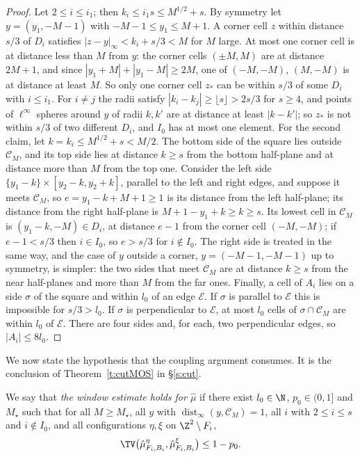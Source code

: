 \begin{proof}
Let $2 \le i \le i_1$; then $k_i \le i_1 s \le M^{1/2} + s$. By symmetry let $y = (y_1, -M - 1)$ with $-M - 1 \le y_1 \le M + 1$. A corner cell $z$ within distance $s/3$ of $D_i$ satisfies $|z - y|_\infty < k_i + s/3 < M$ for $M$ large. At most one corner cell is at distance less than $M$ from $y$: the corner cells $(\pm M, M)$ are at distance $2M + 1$, and since $|y_1 + M| + |y_1 - M| \ge 2M$, one of $(-M, -M)$, $(M, -M)$ is at distance at least $M$. So only one corner cell $z_*$ can be within $s/3$ of some $D_i$ with $i \le i_1$. For $i \neq j$ the radii satisfy $|k_i - k_j| \ge \lfloor s \rfloor > 2s/3$ for $s \ge 4$, and points of $\ell^\infty$ spheres around $y$ of radii $k, k'$ are at distance at least $|k - k'|$; so $z_*$ is not within $s/3$ of two different $D_i$, and $I_0$ has at most one element. For the second claim, let $k = k_i \le M^{1/2} + s < M/2$. The bottom side of the square lies outside $\mathcal C_M$, and its top side lies at distance $k \ge s$ from the bottom half-plane and at distance more than $M$ from the top one. Consider the left side $\{y_1 - k\} \times [y_2 - k, y_2 + k]$, parallel to the left and right edges, and suppose it meets $\mathcal C_M$, so $e = y_1 - k + M + 1 \ge 1$ is its distance from the left half-plane; its distance from the right half-plane is $M + 1 - y_1 + k \ge k \ge s$. Its lowest cell in $\mathcal C_M$ is $(y_1 - k, -M) \in D_i$, at distance $e - 1$ from the corner cell $(-M, -M)$; if $e - 1 < s/3$ then $i \in I_0$, so $e > s/3$ for $i \notin I_0$. The right side is treated in the same way, and the case of $y$ outside a corner, $y = (-M - 1, -M - 1)$ up to symmetry, is simpler: the two sides that meet $\mathcal C_M$ are at distance $k \ge s$ from the near half-planes and more than $M$ from the far ones. Finally, a cell of $A_i$ lies on a side $\sigma$ of the square and within $l_0$ of an edge $\mathcal E$. If $\sigma$ is parallel to $\mathcal E$ this is impossible for $s/3 > l_0$. If $\sigma$ is perpendicular to $\mathcal E$, at most $l_0$ cells of $\sigma \cap \mathcal C_M$ are within $l_0$ of $\mathcal E$. There are four sides and, for each, two perpendicular edges, so $|A_i| \le 8 l_0$.
\end{proof}

We now state the hypothesis that the coupling argument consumes. It is the conclusion of Theorem~\ref{t:cutMOS} in \S\ref{s:cut}.

\begin{definition}\label{d:W}
We say that \emph{the window estimate holds for $\hat\mu$} if there exist $l_0 \in \N$, $p_0 \in (0, 1]$ and $M_\star$ such that for all $M \ge M_\star$, all $y$ with $\operatorname{dist}_\infty(y, \mathcal C_M) = 1$, all $i$ with $2 \le i \le s$ and $i \notin I_0$, and all configurations $\eta, \xi$ on $\Z^2 \setminus F_i$,
\begin{equation}\label{e:W}
\TV\bigl( \hat\mu^\eta_{F_i, B_i}, \hat\mu^\xi_{F_i, B_i} \bigr) \le 1 - p_0 .
\end{equation}
\end{definition}

